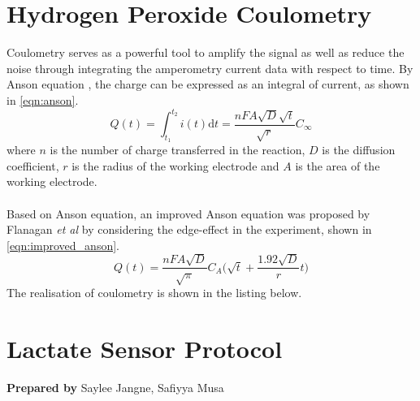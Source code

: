 \begin{appendices}
\section{Hydrogen Peroxide Coulometry} \label{app:h2o2_coulometry}
\noindent Coulometry serves as a powerful tool to amplify the signal as well as reduce the noise through integrating the amperometry current data with respect to time. By Anson equation \cite{Anson1966}, the charge can be expressed as an integral of current, as shown in \autoref{eqn:anson}. 
\begin{equation}\label{eqn:anson}
    Q(t) = \int_{t_{1}}^{t_{2}}i(t) \mathrm{d}t = \frac{nFA\sqrt{D}\sqrt{t}}{\sqrt{r}}C_{\infty}
\end{equation}
where $n$ is the number of charge transferred in the reaction, $D$ is the diffusion coefficient, $r$ is the radius of the working electrode and $A$ is the area of the working electrode.\\\\
Based on Anson equation, an improved Anson equation was proposed by Flanagan \textit{et al} \cite{Flanagan1973} by considering the edge-effect in the experiment, shown in \autoref{eqn:improved_anson}.
\begin{equation}\label{eqn:improved_anson}
    Q(t) = \frac{nFA\sqrt{D}}{\sqrt{\pi}}C_{A}\bigg( \sqrt{t}+\frac{1.92\sqrt{D}}{r}t\bigg)
\end{equation}
\noindent The realisation of coulometry is shown in the listing below.


\newpage
\section{Lactate Sensor Protocol}
\label{app:lactate_protocol}
\textbf{Prepared by} Saylee Jangne, Safiyya Musa


\end{appendices}

